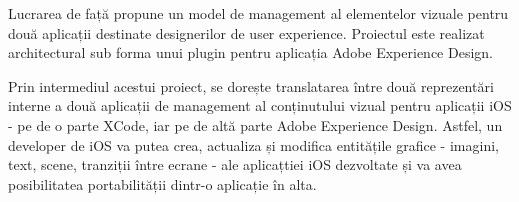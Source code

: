 
\par Lucrarea de față propune un model de management al elementelor vizuale pentru două aplicații destinate designerilor de user experience. Proiectul  este realizat architectural sub forma unui plugin pentru aplicația Adobe Experience Design. 
\par Prin intermediul acestui proiect, se dorește translatarea între două reprezentări interne a două aplicații de management al conținutului vizual pentru aplicații iOS - pe de o parte XCode, iar pe de altă parte Adobe Experience Design. Astfel, un developer de iOS va putea crea, actualiza și modifica entitățile grafice - imagini, text, scene, tranziții între ecrane - ale aplicațtiei iOS dezvoltate și va avea posibilitatea portabilității dintr-o aplicație în alta.


